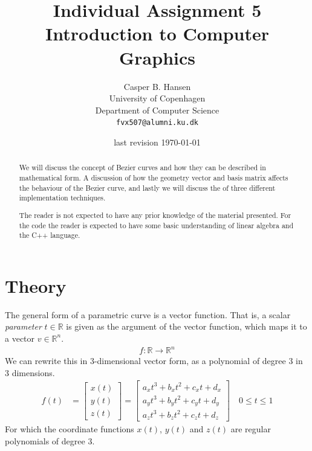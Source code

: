 \documentclass[11pt]{article}
\title
{
    {\Large Individual Assignment 5} \\
    Introduction to Computer Graphics
}
\author
{
    Casper B. Hansen \\
    University of Copenhagen \\
    Department of Computer Science \\
    {\tt fvx507@alumni.ku.dk}
}
\date{last revision \today}
\newcommand{\imp}{\rightarrow}
\begin{document}
\clearpage\maketitle\vspace{1in}
\begin{multicols}{2}
    \begin{abstract}
        We will discuss the concept of Bezier curves and how they can be
        described in mathematical form. A discussion of how the geometry
        vector and basis matrix affects the behaviour of the Bezier curve, and
        lastly we will discuss the of three different implementation
        techniques.
        
        The reader is not expected to have any prior knowledge of the material
        presented. For the code the reader is expected to have some basic
        understanding of linear algebra and the C++ language.
    \end{abstract}
    \vfill\columnbreak\tableofcontents\vfill
\end{multicols}
\thispagestyle{empty}\newpage

\section{Theory}
The general form of a parametric curve is a vector function. That is, a scalar
{\it parameter} $t \in \mathbb{R}$ is given as the argument of the vector
function, which maps it to a vector $v \in \mathbb{R}^n$.
\begin{align}
    f : \mathbb{R} \imp \mathbb{R}^n
\end{align}
We can rewrite this in 3-dimensional vector form, as a polynomial of degree 3 in 3
dimensions.
\begin{align}
    f(t) &=
    \begin{bmatrix}
        x(t) \\
        y(t) \\
        z(t)
    \end{bmatrix}
    =
    \begin{bmatrix}
        a_x t^3 + b_x t^2 + c_x t + d_x \\
        a_y t^3 + b_y t^2 + c_y t + d_y \\
        a_z t^3 + b_z t^2 + c_z t + d_z
    \end{bmatrix}
    \quad
    0 \leq t \leq 1
\end{align}
For which the coordinate functions $x(t)$, $y(t)$ and $z(t)$ are regular
polynomials of degree 3.
\end{document}
